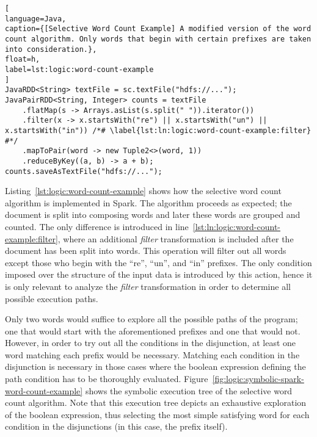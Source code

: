 \begin{lstlisting}[
language=Java,
caption={[Selective Word Count Example] A modified version of the word count algorithm. Only words that begin with certain prefixes are taken into consideration.},
float=h,
label=lst:logic:word-count-example
]
JavaRDD<String> textFile = sc.textFile("hdfs://...");
JavaPairRDD<String, Integer> counts = textFile
	.flatMap(s -> Arrays.asList(s.split(" ")).iterator())
	.filter(x -> x.startsWith("re") || x.startsWith("un") || x.startsWith("in")) /*# \label{lst:ln:logic:word-count-example:filter} #*/	
	.mapToPair(word -> new Tuple2<>(word, 1))
	.reduceByKey((a, b) -> a + b);	
counts.saveAsTextFile("hdfs://...");
\end{lstlisting}

Listing~\ref{lst:logic:word-count-example} shows how the selective word count algorithm is implemented in Spark. The algorithm proceeds as expected; the document is split into composing words and later these words are grouped and counted. The only difference is introduced in line~\ref{lst:ln:logic:word-count-example:filter}, where an additional \textit{filter} transformation is included after the document has been split into words. This operation will filter out all words except those who begin with the ``re'', ``un'', and ``in'' prefixes. The only condition imposed over the structure of the input data is introduced by this action, hence it is only relevant to analyze the \textit{filter} transformation in order to determine all possible execution paths.

Only two words would suffice to explore all the possible paths of the program; one that would start with the aforementioned prefixes and one that would not. However, in order to try out all the conditions in the disjunction, at least one word matching each prefix would be necessary. Matching each condition in the disjunction is necessary in those cases where the boolean expression defining the path condition has to be thoroughly evaluated. Figure~\ref{fig:logic:symbolic-spark-word-count-example} shows the symbolic execution tree of the selective word count algorithm. Note that this execution tree depicts an exhaustive exploration of the boolean expression, thus selecting the most simple satisfying word for each condition in the disjunctions (in this case, the prefix itself).

